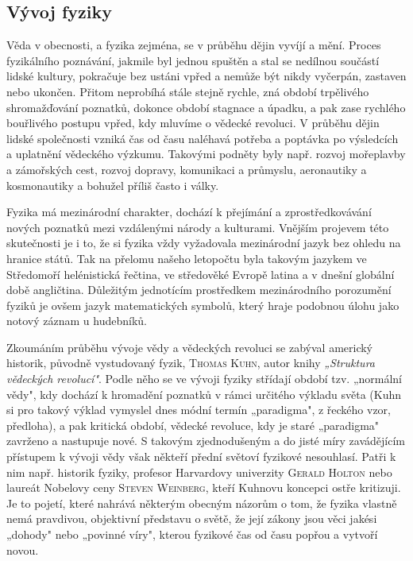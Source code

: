     \newpage  
    \subsection{Vývoj fyziky}\label{fyz:IchapIIsecIII}     
      Věda v obecnosti, a fyzika zejména, se v průběhu dějin vyvíjí a mění. Proces fyzikálního
      poznávání, jakmile byl jednou spuštěn a stal se nedílnou součástí lidské kultury, pokračuje
      bez ustáni vpřed a nemůže být nikdy vyčerpán, zastaven nebo ukončen. Přitom neprobíhá stále
      stejně rychle, zná období trpělivého shromažďování poznatků, dokonce období stagnace a úpadku,
      a pak zase rychlého bouřlivého postupu vpřed, kdy mluvíme o vědecké revoluci. V průběhu dějin
      lidské společnosti vzniká čas od času naléhavá potřeba a poptávka po výsledcích a uplatnění
      vědeckého výzkumu. Takovými podněty byly např. rozvoj mořeplavby a zámořských cest, rozvoj
      dopravy, komunikaci a průmyslu, aeronautiky a kosmonautiky a bohužel příliš často i války.

      Fyzika má mezinárodní charakter, dochází k přejímání a zprostředkovávání nových poznatků mezi
      vzdálenými národy a kulturami. Vnějším projevem této skutečnosti je i to, že si fyzika vždy
      vyžadovala mezinárodní jazyk bez ohledu na hranice států. Tak na přelomu našeho letopočtu byla
      takovým jazykem ve Středomoří helénistická řečtina, ve středověké Evropě latina a v dnešní
      globální době angličtina. Důležitým jednotícím prostředkem mezinárodního porozumění fyziků je
      ovšem jazyk matematických symbolů, který hraje podobnou úlohu jako notový záznam u hudebníků.

      Zkoumáním průběhu vývoje vědy a vědeckých revoluci se zabýval americký historik, původně
      vystudovaný fyzik, \textsc{Thomas Kuhn}, autor knihy \emph{„Struktura vědeckých revolucí"}.
      Podle něho se ve vývoji fyziky střídají období tzv. „normální vědy", kdy dochází k hromadění
      poznatků v rámci určitého výkladu světa (Kuhn si pro takový výklad vymyslel dnes módní termín
      „paradigma", z řeckého vzor, předloha), a pak kritická období, vědecké revoluce, kdy je staré
      „paradigma" zavrženo a nastupuje nové. S takovým zjednodušeným a do jisté míry zavádějícím
      přístupem k vývoji vědy však někteří přední světoví fyzikové nesouhlasí. Patři k nim např.
      historik fyziky, profesor Harvardovy univerzity \textsc{Gerald Holton} nebo laureát Nobelovy
      ceny \textsc{Steven Weinberg}, kteří Kuhnovu koncepci ostře kritizuji. Je to pojetí, které
      nahrává některým obecným názorům o tom, že fyzika vlastně nemá pravdivou, objektivní představu
      o světě, že její zákony jsou věci jakési „dohody" nebo „povinné víry", kterou fyzikové čas od
      času popřou a vytvoří novou.

